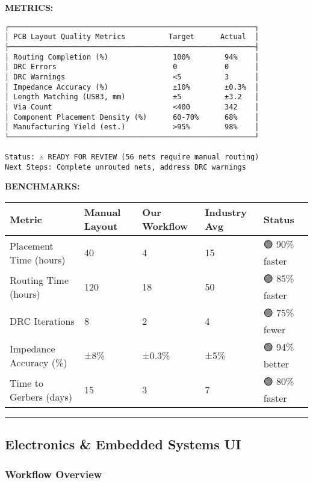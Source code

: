 \documentclass[
]{article}
\begin{document}
\textbf{METRICS:}

\begin{verbatim}
┌─────────────────────────────────────────────────────────┐
│ PCB Layout Quality Metrics          Target      Actual  │
├─────────────────────────────────────────────────────────┤
│ Routing Completion (%)               100%        94%    │
│ DRC Errors                           0           0      │
│ DRC Warnings                         <5          3      │
│ Impedance Accuracy (%)               ±10%        ±0.3%  │
│ Length Matching (USB3, mm)           ±5          ±3.2   │
│ Via Count                            <400        342    │
│ Component Placement Density (%)      60-70%      68%    │
│ Manufacturing Yield (est.)           >95%        98%    │
└─────────────────────────────────────────────────────────┘

Status: ⚠ READY FOR REVIEW (56 nets require manual routing)
Next Steps: Complete unrouted nets, address DRC warnings
\end{verbatim}

\textbf{BENCHMARKS:}

\begin{longtable}[]{@{}lllll@{}}
\toprule\noalign{}
Metric & Manual Layout & Our Workflow & Industry Avg & Status \\
\midrule\noalign{}
\endhead
\bottomrule\noalign{}
\endlastfoot
Placement Time (hours) & 40 & 4 & 15 & 🟢 90\% faster \\
Routing Time (hours) & 120 & 18 & 50 & 🟢 85\% faster \\
DRC Iterations & 8 & 2 & 4 & 🟢 75\% fewer \\
Impedance Accuracy (\%) & ±8\% & ±0.3\% & ±5\% & 🟢 94\% better \\
Time to Gerbers (days) & 15 & 3 & 7 & 🟢 80\% faster \\
\end{longtable}

\begin{center}\rule{0.5\linewidth}{0.5pt}\end{center}

\hypertarget{electronics-embedded-systems-ui}{%
\subsection{Electronics \& Embedded Systems
UI}\label{electronics-embedded-systems-ui}}

\hypertarget{workflow-overview-2}{%
\subsubsection{Workflow Overview}\label{workflow-overview-2}}
\end{document}
